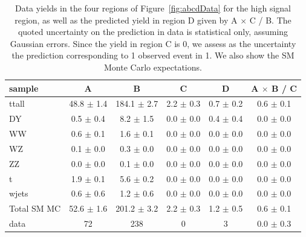 \begin{table}[hbt]
\begin{center}
\caption{\label{tab:datayield3} Data yields in the four
regions of Figure~\ref{fig:abcdData} for the high \Ht signal region, 
as well as the predicted yield in region D given
by A $\times$ C / B.  The quoted uncertainty
on the prediction in data is statistical only, assuming Gaussian errors.
Since the yield in region C is 0, we assess as the uncertainty the prediction
corresponding to 1 observed event in 1.
We also show the SM Monte Carlo expectations.}
\begin{tabular}{l||c|c|c|c||c}
\hline
           sample  &                A  &                B  &                C  &                D  &   A $\times$ B / C  \\
\hline
            ttall  & 48.8  $\pm$  1.4  &184.1  $\pm$  2.7  &  2.2  $\pm$  0.3  &  0.7  $\pm$  0.2  &  0.6  $\pm$  0.1   \\
               DY  &  0.5  $\pm$  0.4  &  8.2  $\pm$  1.5  &  0.0  $\pm$  0.0  &  0.4  $\pm$  0.4  &  0.0  $\pm$  0.0   \\
               WW  &  0.6  $\pm$  0.1  &  1.6  $\pm$  0.1  &  0.0  $\pm$  0.0  &  0.0  $\pm$  0.0  &  0.0  $\pm$  0.0   \\
               WZ  &  0.1  $\pm$  0.0  &  0.3  $\pm$  0.0  &  0.0  $\pm$  0.0  &  0.0  $\pm$  0.0  &  0.0  $\pm$  0.0   \\
               ZZ  &  0.0  $\pm$  0.0  &  0.1  $\pm$  0.0  &  0.0  $\pm$  0.0  &  0.0  $\pm$  0.0  &  0.0  $\pm$  0.0   \\
                t  &  1.9  $\pm$  0.1  &  5.6  $\pm$  0.2  &  0.0  $\pm$  0.0  &  0.0  $\pm$  0.0  &  0.0  $\pm$  0.0   \\
            wjets  &  0.6  $\pm$  0.6  &  1.2  $\pm$  0.6  &  0.0  $\pm$  0.0  &  0.0  $\pm$  0.0  &  0.0  $\pm$  0.0   \\
\hline
      Total SM MC  & 52.6  $\pm$  1.6  &201.2  $\pm$  3.2  &  2.2  $\pm$  0.3  &  1.2  $\pm$  0.5  &  0.6  $\pm$  0.1   \\
\hline
             data  &               72  &              238  &                0  &                3  &  0.0  $\pm$  0.3   \\
\hline
\end{tabular}
\end{center}
\end{table}







